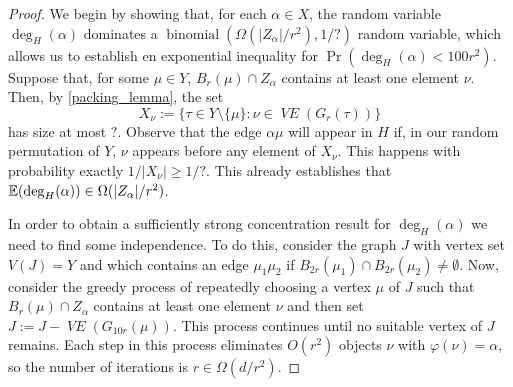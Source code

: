 \documentclass{patmorin}
\DeclareMathOperator{\binomial}{binomial}
\DeclareMathOperator{\VE}{\mathit{VE}}
\begin{document}
\begin{proof}
  We begin by showing that, for each $\alpha\in X$, the random variable $\deg_H(\alpha)$ dominates a $\binomial(\Omega(|Z_\alpha|/r^2),1/?)$ random variable, which allows us to establish en exponential inequality for $\Pr(\deg_H(\alpha) < 100r^2)$.
  Suppose that, for some $\mu\in Y$, $B_r(\mu)\cap Z_\alpha$ contains at least one element $\nu$. Then, by \cref{packing_lemma}, the set
  \[
     X_\nu := \{\tau\in Y\setminus\{\mu\}:\nu\in\VE(G_r(\tau))\}
  \]
  has size at most $?$. Observe that the edge $\alpha\mu$ will appear in $H$ if, in our random permutation of $Y$, $\nu$ appears before any element of $X_\nu$.  This happens with probability exactly $1/|X_\nu|\ge 1/?$.  This already establishes that $\mathbb{E}(\deg_H(\alpha)) \in \Omega(|Z_\alpha|/r^2)$.

  In order to obtain a sufficiently strong concentration result for $\deg_H(\alpha)$ we need to find some independence.  To do this, consider the graph $J$ with vertex set $V(J)=Y$ and which contains an edge $\mu_1\mu_2$ if $B_{2r}(\mu_1)\cap B_{2r}(\mu_2)\neq\emptyset$.  Now, consider the greedy process of repeatedly choosing a vertex $\mu$ of $J$ such that $B_r(\mu)\cap Z_\alpha$ contains at least one element $\nu$ and then set $J:=J-\VE(G_{10r}(\mu))$.  This process continues until no suitable vertex of $J$ remains.  Each step in this process eliminates $O(r^2)$ objects $\nu$ with $\varphi(\nu)=\alpha$, so the number of iterations is $r\in\Omega(d/r^2)$.


\end{proof}
\end{document}
